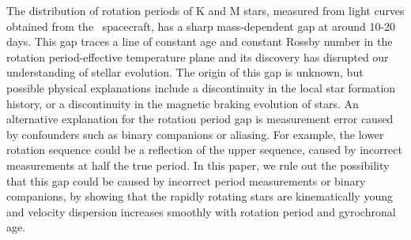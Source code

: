 The distribution of rotation periods of K and M stars, measured from light
curves obtained from the \kepler\ spacecraft, has a sharp mass-dependent gap
at around 10-20 days.
This gap traces a line of constant age and constant Rossby number in the
rotation period-effective temperature plane and its discovery has disrupted
our understanding of stellar evolution.
The origin of this gap is unknown, but possible physical explanations include
a discontinuity in the local star formation history, or a discontinuity in the
magnetic braking evolution of stars.
An alternative explanation for the rotation period gap is measurement error
caused by confounders such as binary companions or aliasing.
For example, the lower rotation sequence could be a reflection of the upper
sequence, caused by incorrect measurements at half the true period.
In this paper, we rule out the possibility that this gap could be caused by
incorrect period measurements or binary companions, by showing that the
rapidly rotating stars are kinematically young and velocity dispersion
increases smoothly with rotation period and gyrochronal age.
